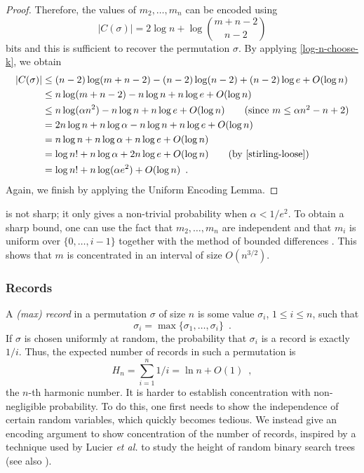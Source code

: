 \documentclass{patmorin}
\begin{document}
\begin{proof}
  Therefore, the values of $m_2,\ldots,m_n$ can be encoded using
  \[
    |C(\sigma)| = 2\log n + \log\binom{m+n-2}{n-2}
  \]
  bits and this is sufficient to recover the permutation $\sigma$.  By
  applying \eqref{log-n-choose-k}, we obtain
  \begin{align*}
    |C(\sigma)| & \le (n-2)\log(m+n-2) - (n-2)\log(n-2)  + (n-2)\log e + O(\log n) \\
      & \le n\log(m+n-2) - n\log n   + n\log e + O(\log n) \\
      & \le n\log(\alpha n^2) - n\log n  + n\log e + O(\log n) \tag{since $m \le \alpha n^2 - n + 2$}\\
      & = 2n\log n + n\log\alpha - n\log n  + n\log e + O(\log n) \\
      & = n\log n + n\log\alpha + n\log e + O(\log n) \\
      & = \log n! + n\log\alpha + 2n\log e + O(\log n) \tag{by \eqref{stirling-loose}} \\
      & = \log n! + n \log (\alpha e^2) + O(\log n) \enspace .
  \end{align*}
  Again, we finish by applying the Uniform Encoding Lemma.
\end{proof}


\begin{rem}
   is not sharp; it only gives a non-trivial
  probability when $\alpha < 1/e^2$.  To obtain a sharp bound, one can
  use the fact that $m_2,\ldots,m_n$ are independent and that $m_i$ is
  uniform over $\{0,\ldots,i-1\}$ together with the method of bounded
  differences \cite{mcdiarmid:on}. This shows that $m$ is concentrated in
  an interval of size $O(n^{3/2})$.
\end{rem}

\subsubsection{Records}

A \emph{(max) record} in a permutation $\sigma$ of size
$n$ is some value $\sigma_i$, $1 \leq i \leq n$, such that
\[
  \sigma_i = \max\{\sigma_1, \dots, \sigma_i\} \enspace .
\]
If $\sigma$ is chosen uniformly at random, the probability that 
$\sigma_i$ is a record is exactly $1/i$. Thus, 
the expected number of records in such a permutation is
\[
  H_n = \sum_{i = 1}^n 1/i = \ln n + O(1) \enspace ,
\]
the $n$-th harmonic number. It is harder to establish concentration
with non-negligible probability. To do this, one first needs to show
the independence of certain random variables, which quickly becomes
tedious. We instead give an encoding argument to show concentration of
the number of records, inspired by a technique used by Lucier \emph{et
  al.} to study the height of random binary search trees
\cite{lucier.jiang.li:quicksort} (see also ).
\end{document}
